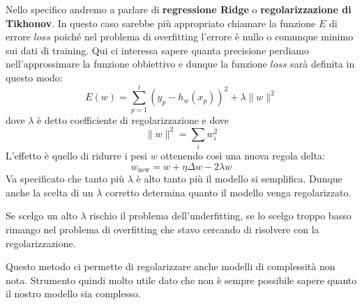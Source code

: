 Nello specifico andremo a parlare di \textbf{regressione Ridge} o \textbf{regolarizzazione di Tikhonov}. In questo caso
sarebbe pi\`u appropriato chiamare la funzione $E$ di errore $loss$ poich\'e nel problema di overfitting l'errore \`e
nullo o comunque minimo sui dati di training. Qui ci interessa sapere quanta precisione perdiamo nell'approssimare la
funzione obbiettivo e dunque la funzione $loss$ sar\`a definita in questo modo:
\[ E(w) = \sum_{p = 1}^l (y_p - h_w(x_p))^2 + \lambda \| w \|^2 \]
dove $\lambda$ \`e detto coefficiente di regolarizzazione e dove
\[ \| w \|^2 = \sum_{i} w_i^2 \]
L'effetto \`e quello di ridurre i pesi $w$ ottenendo cos\`i una nuova regola delta:
\[ w_{\text{new}} = w + \eta \Delta w - 2 \lambda w \]
Va specificato che tanto pi\`u $\lambda$ \`e alto tanto pi\`u il modello si semplifica. Dunque anche la scelta di un
$\lambda$ corretto determina quanto il modello venga regolarizzato.

Se scelgo un alto $\lambda$ rischio il problema dell'underfitting, se lo scelgo troppo basso rimango nel problema di
overfitting che stavo cercando di risolvere con la regolarizzazione.

Questo metodo ci permette di regolarizzare anche modelli di complessit\`a non nota. Strumento quindi molto utile dato
che non \`e sempre possibile sapere quanto il nostro modello sia complesso.

